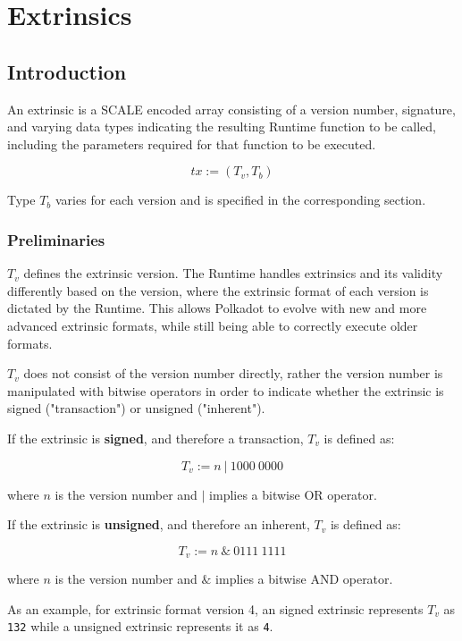 \newpage
\chapter{Extrinsics}

\section{Introduction}

An extrinsic is a SCALE encoded array consisting of a version number,
signature, and varying data types indicating the resulting Runtime function to
be called, including the parameters required for that function to be executed.
\newline

\[
    tx := (T_v, T_b)
\]

Type $T_b$ varies for each version and is specified in the corresponding
section.

\subsection{Preliminaries}

\begin{definition}
    \label{defn-extrinsic-version}
    $T_v$ defines the extrinsic version. The Runtime handles extrinsics and
    its validity differently based on the version, where the extrinsic format
    of each version is dictated by the Runtime. This allows Polkadot to evolve
    with new and more advanced extrinsic formats, while still being able to
    correctly execute older formats.
    \newline

    $T_v$ does not consist of the version number directly, rather the version
    number is manipulated with bitwise operators in order to indicate whether
    the extrinsic is signed ("transaction") or unsigned ("inherent").
    \newline

    If the extrinsic is \textbf{signed}, and therefore a transaction, $T_v$ is
    defined as:

    \[
        T_v := n \ | \ 1000 \ 0000
    \]

    where $n$ is the version number and $|$ implies a bitwise OR operator.
    \newline
    \newpage

    If the extrinsic is \textbf{unsigned}, and therefore an inherent, $T_v$ is
    defined as:

    \[
        T_v := n \ \& \ 0111 \ 1111
    \]

    where $n$ is the version number and $\&$ implies a bitwise AND operator.
    \newline

    As an example, for extrinsic format version 4, an signed extrinsic
    represents $T_v$ as \verb|132| while a unsigned extrinsic represents it as
    \verb|4|.
\end{definition}

